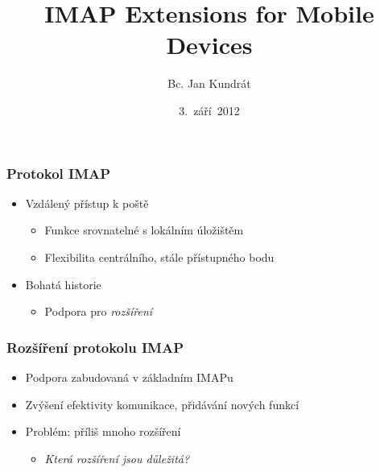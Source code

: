 \documentclass{beamer}
\begin{document}
\title{IMAP Extensions for Mobile Devices}
\author{Bc. Jan Kundrát}
\date{3.~září~2012}

\begin{frame}
\maketitle
\end{frame}

\begin{frame}[fragile]
  \frametitle{Protokol IMAP}
  \begin{itemize}
    \item Vzdálený přístup k poště
      \begin{itemize}
        \item Funkce srovnatelné s lokálním úložištěm
        \item Flexibilita centrálního, stále přístupného bodu
      \end{itemize}
    \item Bohatá historie
      \begin{itemize}
        \item Podpora pro {\em rozšíření}
      \end{itemize}
  \end{itemize}
\end{frame}

\begin{frame}[fragile]
  \frametitle{Rozšíření protokolu IMAP}
  \begin{itemize}
    \item Podpora zabudovaná v základním IMAPu
    \item Zvýšení efektivity komunikace, přidávání nových funkcí
    \item Problém: příliš mnoho rozšíření
      \begin{itemize}
        \item {\em Která rozšíření jsou důležitá?}
      \end{itemize}
  \end{itemize}
\end{frame}
\end{document}

